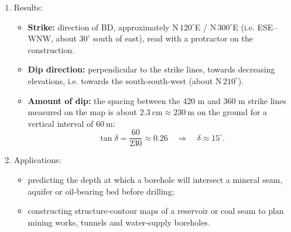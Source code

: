 \documentclass[11pt]{article}
\begin{document}
\begin{corrige}
\begin{enumerate}
\begin{popfigure}
\end{popfigure}
\item Results:
\begin{itemize}
\item \textbf{Strike:} direction of BD, approximately N$\,120^{\circ}$E / N$\,300^{\circ}$E (i.e. ESE--WNW, about $30^{\circ}$ south of east), read with a protractor on the construction.
\item \textbf{Dip direction:} perpendicular to the strike lines, towards decreasing elevations, i.e. towards the south-south-west (about N$\,210^{\circ}$).
\item \textbf{Amount of dip:} the spacing between the 420 m and 360 m strike lines measured on the map is about $2.3\ \mathrm{cm} \approx 230\ \mathrm{m}$ on the ground for a vertical interval of $60\ \mathrm{m}$:
\[ \tan\delta = \frac{60}{230} \approx 0.26 \quad\Rightarrow\quad \delta \approx 15^{\circ}. \]
\end{itemize}
\item Applications:
\begin{itemize}
\item predicting the depth at which a borehole will intersect a mineral seam, aquifer or oil-bearing bed before drilling;
\item constructing structure-contour maps of a reservoir or coal seam to plan mining works, tunnels and water-supply boreholes.
\end{itemize}
\end{enumerate}
\end{corrige}
\end{document}
